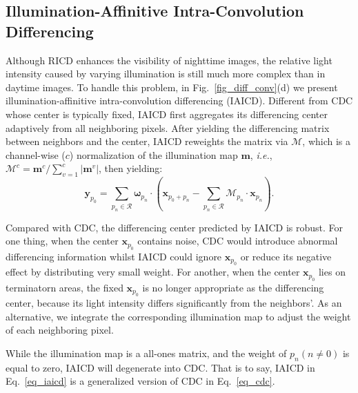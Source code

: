 \documentclass[lettersize,journal]{IEEEtran}
\begin{document}
\subsection{Illumination-Affinitive Intra-Convolution Differencing}\label{sec_IAICD}
Although RICD enhances the visibility of nighttime images, the relative light intensity caused by varying illumination is still much more complex than in daytime images. To handle this problem, in Fig.~\ref{fig_diff_conv}(d) we present illumination-affinitive intra-convolution differencing (IAICD). Different from CDC \cite{yu2020searching} whose center is typically fixed, IAICD first aggregates its differencing center adaptively from all neighboring pixels. After yielding the differencing matrix between neighbors and the center, IAICD reweights the matrix via $\mathcal{M}$, which is a channel-wise ($c$) normalization of the illumination map $\boldsymbol m$, \emph{i.e.}, ${{\mathcal{M}}^{c}}={{{\boldsymbol m}^{c}}}/{\sum\limits_{v=1}^{c}{\left| {{\boldsymbol m}^{v}} \right|}}$, then yielding: 
\begin{equation}\label{eq_iaicd}
\boldsymbol y_{p_0}=\sum_{p_n\in \mathcal{R}}{\boldsymbol \omega_{p_n} \cdot ( \boldsymbol x_{p_0 + p_n} - \sum_{p_n\in \mathcal{R}}{\mathcal{M}_{p_n} \cdot \boldsymbol x_{p_n}} )}.
\end{equation}

Compared with CDC, the differencing center predicted by IAICD is robust. For one thing, when the center $\boldsymbol x_{p_0}$ contains noise, CDC would introduce abnormal differencing information whilst IAICD could ignore $\boldsymbol x_{p_0}$ or reduce its negative effect by distributing very small weight. For another, when the center $\boldsymbol x_{p_0}$ lies on terminatorn areas, the fixed $\boldsymbol x_{p_0}$ is no longer appropriate as the differencing center, because its light intensity differs significantly from the neighbors'. As an alternative, we integrate the corresponding illumination map to adjust the weight of each neighboring pixel. 

While the illumination map is a all-ones matrix, and the weight of $p_n (n\neq 0)$ is equal to zero, IAICD will degenerate into CDC. That is to say, IAICD in Eq.~\ref{eq_iaicd} is a generalized version of CDC in Eq.~\ref{eq_cdc}.
\end{document}
